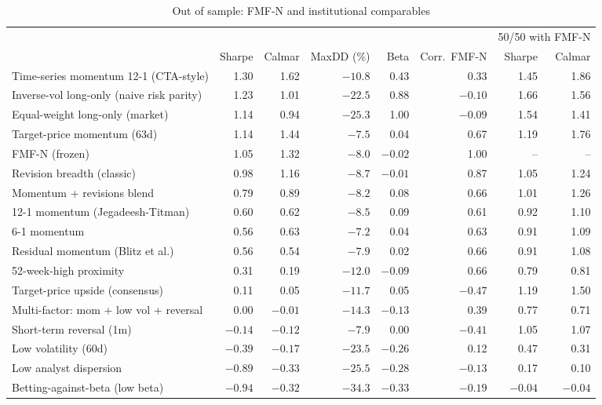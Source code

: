 \begin{table}[t]
\centering\footnotesize
\caption{Out of sample: FMF-N and institutional comparables}\label{tab:oos_league}
\begin{adjustbox}{max width=\textwidth}\begin{tabular}{lrrrrrrr}
\toprule
 & & & & & & \multicolumn{2}{c}{50/50 with FMF-N}\\
\cmidrule(lr){7-8}
 & Sharpe & Calmar & MaxDD (\%) & Beta & Corr.\ FMF-N & Sharpe & Calmar\\
\midrule
Time-series momentum 12-1 (CTA-style) & 1.30 & 1.62 & $-10.8$ & 0.43 & 0.33 & 1.45 & 1.86\\
Inverse-vol long-only (naive risk parity) & 1.23 & 1.01 & $-22.5$ & 0.88 & $-0.10$ & 1.66 & 1.56\\
Equal-weight long-only (market) & 1.14 & 0.94 & $-25.3$ & 1.00 & $-0.09$ & 1.54 & 1.41\\
Target-price momentum (63d) & 1.14 & 1.44 & $-7.5$ & 0.04 & 0.67 & 1.19 & 1.76\\
FMF-N (frozen) & 1.05 & 1.32 & $-8.0$ & $-0.02$ & 1.00 & -- & --\\
Revision breadth (classic) & 0.98 & 1.16 & $-8.7$ & $-0.01$ & 0.87 & 1.05 & 1.24\\
Momentum + revisions blend & 0.79 & 0.89 & $-8.2$ & 0.08 & 0.66 & 1.01 & 1.26\\
12-1 momentum (Jegadeesh-Titman) & 0.60 & 0.62 & $-8.5$ & 0.09 & 0.61 & 0.92 & 1.10\\
6-1 momentum & 0.56 & 0.63 & $-7.2$ & 0.04 & 0.63 & 0.91 & 1.09\\
Residual momentum (Blitz et al.) & 0.56 & 0.54 & $-7.9$ & 0.02 & 0.66 & 0.91 & 1.08\\
52-week-high proximity & 0.31 & 0.19 & $-12.0$ & $-0.09$ & 0.66 & 0.79 & 0.81\\
Target-price upside (consensus) & 0.11 & 0.05 & $-11.7$ & 0.05 & $-0.47$ & 1.19 & 1.50\\
Multi-factor: mom + low vol + reversal & 0.00 & $-0.01$ & $-14.3$ & $-0.13$ & 0.39 & 0.77 & 0.71\\
Short-term reversal (1m) & $-0.14$ & $-0.12$ & $-7.9$ & 0.00 & $-0.41$ & 1.05 & 1.07\\
Low volatility (60d) & $-0.39$ & $-0.17$ & $-23.5$ & $-0.26$ & 0.12 & 0.47 & 0.31\\
Low analyst dispersion & $-0.89$ & $-0.33$ & $-25.5$ & $-0.28$ & $-0.13$ & 0.17 & 0.10\\
Betting-against-beta (low beta) & $-0.94$ & $-0.32$ & $-34.3$ & $-0.33$ & $-0.19$ & $-0.04$ & $-0.04$\\
\bottomrule
\end{tabular}\end{adjustbox}
\end{table}

